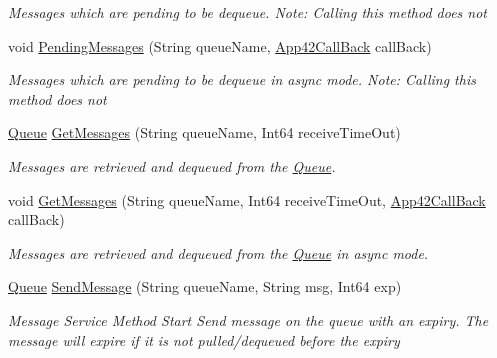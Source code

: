 \begin{DoxyCompactItemize}
\begin{DoxyCompactList}\small\item\em Messages which are pending to be dequeue. Note\+: Calling this method does not \end{DoxyCompactList}\item 
void \hyperlink{classcom_1_1shephertz_1_1app42_1_1paas_1_1sdk_1_1csharp_1_1message_1_1_queue_service_abd9290a69c02e63a2942f89dad5c539b}{Pending\+Messages} (String queue\+Name, \hyperlink{interfacecom_1_1shephertz_1_1app42_1_1paas_1_1sdk_1_1csharp_1_1_app42_call_back}{App42\+Call\+Back} call\+Back)
\begin{DoxyCompactList}\small\item\em Messages which are pending to be dequeue in async mode. Note\+: Calling this method does not \end{DoxyCompactList}\item 
\hyperlink{classcom_1_1shephertz_1_1app42_1_1paas_1_1sdk_1_1csharp_1_1message_1_1_queue}{Queue} \hyperlink{classcom_1_1shephertz_1_1app42_1_1paas_1_1sdk_1_1csharp_1_1message_1_1_queue_service_a82be76b9d28bfb1dffff67f8c4ba5abc}{Get\+Messages} (String queue\+Name, Int64 receive\+Time\+Out)
\begin{DoxyCompactList}\small\item\em Messages are retrieved and dequeued from the \hyperlink{classcom_1_1shephertz_1_1app42_1_1paas_1_1sdk_1_1csharp_1_1message_1_1_queue}{Queue}. \end{DoxyCompactList}\item 
void \hyperlink{classcom_1_1shephertz_1_1app42_1_1paas_1_1sdk_1_1csharp_1_1message_1_1_queue_service_a4b1e32b68d39ae085d5a59f7da429e0c}{Get\+Messages} (String queue\+Name, Int64 receive\+Time\+Out, \hyperlink{interfacecom_1_1shephertz_1_1app42_1_1paas_1_1sdk_1_1csharp_1_1_app42_call_back}{App42\+Call\+Back} call\+Back)
\begin{DoxyCompactList}\small\item\em Messages are retrieved and dequeued from the \hyperlink{classcom_1_1shephertz_1_1app42_1_1paas_1_1sdk_1_1csharp_1_1message_1_1_queue}{Queue} in async mode. \end{DoxyCompactList}\item 
\hyperlink{classcom_1_1shephertz_1_1app42_1_1paas_1_1sdk_1_1csharp_1_1message_1_1_queue}{Queue} \hyperlink{classcom_1_1shephertz_1_1app42_1_1paas_1_1sdk_1_1csharp_1_1message_1_1_queue_service_a6e67b2a4256be731b99c88ef11042c19}{Send\+Message} (String queue\+Name, String msg, Int64 exp)
\begin{DoxyCompactList}\small\item\em Message Service Method Start Send message on the queue with an expiry. The message will expire if it is not pulled/dequeued before the expiry \end{DoxyCompactList}\item 

\end{DoxyCompactItemize}
